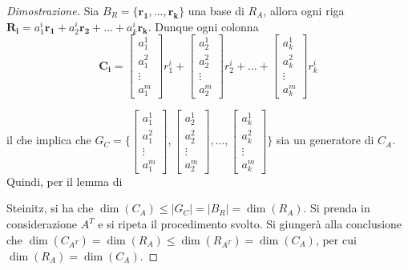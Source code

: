 \documentclass{article}
\begin{document}
    \begin{proof}[Dimostrazione]
        Sia $B_R = \{\mathbf{r_1}, ..., \mathbf{r_k}\}$ una base di $R_A$, allora ogni riga $\mathbf{R_i} = a_{1}^{i} \mathbf{r_1} + a_{2}^{i} \mathbf{r_2} + ... + a_{k}^{i} \mathbf{r_k}$. Dunque ogni colonna 
        \[
            \mathbf{C_i} = 
            \begin{bmatrix}
                a_{1}^{1} \\
                a_{1}^{2} \\
                \vdots \\
                a_{1}^{m}
            \end{bmatrix}
            r_{1}^{i}
            + 
            \begin{bmatrix}
                a_{2}^{1} \\
                a_{2}^{2} \\
                \vdots \\
                a_{2}^{m}
            \end{bmatrix}
            r_{2}^{i}
            +
            \dots
            +
            \begin{bmatrix}
                a_{k}^{1} \\
                a_{k}^{2} \\
                \vdots \\
                a_{k}^{m}
            \end{bmatrix}
            r_{k}^{i}
        \]
        
        il che implica che 
        $G_C = \{
            \begin{bmatrix}
                a_{1}^{1} \\
                a_{1}^{2} \\
                \vdots \\
                a_{1}^{m}
            \end{bmatrix},  
            \begin{bmatrix}
                a_{2}^{1} \\
                a_{2}^{2} \\
                \vdots \\
                a_{2}^{m}
            \end{bmatrix},
            ...,
            \begin{bmatrix}
                a_{k}^{1} \\
                a_{k}^{2} \\
                \vdots \\
                a_{k}^{m}
            \end{bmatrix} 
            \}$
        sia un generatore di $C_A$. Quindi, per il lemma di 

        \vspace{5pt}
        Steinitz, si ha che $\dim(C_A) \leq |G_C| = |B_R| = \dim(R_A)$. Si prenda in considerazione $A^T$ e si ripeta il procedimento svolto.
        Si giungerà alla conclusione che $\dim(C_{A^T}) = \dim(R_A) \leq \dim(R_{A^T}) = \dim(C_A)$, per cui $\dim(R_A) = \dim(C_A)$.
    \end{proof}
\end{document}
